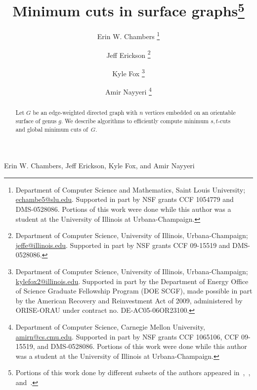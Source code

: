 \documentclass[11pt,twoside]{article}
\begin{document}
\pagestyle{myheadings}
		 {Erin W. Chambers, Jeff Erickson, Kyle Fox, and Amir Nayyeri}

\begin{titlepage}

\title{Minimum cuts in surface graphs\footnote{
Portions of this work done by different subsets of the authors appeared in~\cite{cen-mcshc-09},~\cite{en-mcsnc-11}, and~\cite{efn-gmcse-12}.
}}

\author{
  Erin W. Chambers%
  \thanks{Department of Computer Science and Mathematics, Saint Louis
  University;
  \url{echambe5@slu.edu}.  Supported in part by NSF grants CCF 1054779 and DMS-0528086.
  Portions of this work were done while this author was a student at the University of Illinois at Urbana-Champaign.}
  \and
  Jeff Erickson%
  \thanks{Department of Computer Science,
  University of Illinois, Urbana-Champaign; \url{jeffe@illinois.edu}.
  Supported in part by NSF grants CCF 09-15519 and DMS-0528086.
  }
  \and
  Kyle Fox%
  \thanks{Department of Computer Science,
      University of Illinois, Urbana-Champaign;
      \url{kylefox2@illinois.edu}.
      Supported in part by
      the Department of Energy Office
      of Science Graduate Fellowship Program (DOE SCGF),
      made possible in part by the American Recovery and
      Reinvestment Act of 2009, administered by ORISE-ORAU
      under contract no. DE-AC05-06OR23100.}
  \and
  Amir Nayyeri%
  \thanks{Department of Computer Science,
      Carnegie Mellon University,
      \url{amirn@cs.cmu.edu}. Supported in part by NSF grants
      CCF 1065106, CCF 09-15519, and DMS-0528086. Portions of this work were done while this author was a student 
      at the University of Illinois at Urbana-Champaign.}
      }

\DRAFT

\maketitle
\begin{abstract}
Let $G$ be an edge-weighted directed graph with $n$ vertices embedded on an orientable surface of genus $g$.
We describe algorithms to efficiently compute minimum $s,t$-cuts and global minimum cuts of~$G$.
\end{abstract}

\noindent

\thispagestyle{empty}
\setcounter{page}{0}
\end{titlepage}







\end{document}
